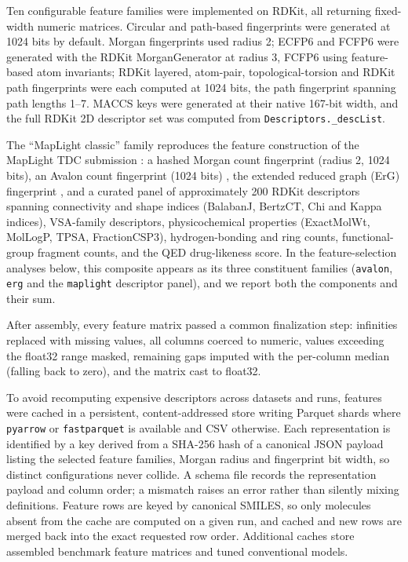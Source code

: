 \documentclass[11pt,a4paper]{article}
\begin{document}
Ten configurable feature families were implemented on RDKit, all returning fixed-width numeric matrices. Circular and path-based fingerprints were generated at 1024 bits by default. Morgan fingerprints \cite{rogers2010ecfp} used radius 2; ECFP6 and FCFP6 were generated with the RDKit MorganGenerator at radius 3, FCFP6 using feature-based atom invariants; RDKit layered, atom-pair, topological-torsion and RDKit path fingerprints were each computed at 1024 bits, the path fingerprint spanning path lengths 1--7. MACCS keys \cite{durant2002maccs} were generated at their native 167-bit width, and the full RDKit 2D descriptor set was computed from \texttt{Descriptors.\_descList}.

The ``MapLight classic'' family reproduces the feature construction of the MapLight TDC submission \cite{notwell2023admet}: a hashed Morgan count fingerprint (radius 2, 1024 bits), an Avalon count fingerprint (1024 bits) \cite{gedeck2006qsar}, the extended reduced graph (ErG) fingerprint \cite{stiefl2006erg}, and a curated panel of approximately 200 RDKit descriptors spanning connectivity and shape indices (BalabanJ, BertzCT, Chi and Kappa indices), VSA-family descriptors, physicochemical properties (ExactMolWt, MolLogP, TPSA, FractionCSP3), hydrogen-bonding and ring counts, functional-group fragment counts, and the QED drug-likeness score. In the feature-selection analyses below, this composite appears as its three constituent families (\texttt{avalon}, \texttt{erg} and the \texttt{maplight} descriptor panel), and we report both the components and their sum.

After assembly, every feature matrix passed a common finalization step: infinities replaced with missing values, all columns coerced to numeric, values exceeding the float32 range masked, remaining gaps imputed with the per-column median (falling back to zero), and the matrix cast to float32.

To avoid recomputing expensive descriptors across datasets and runs, features were cached in a persistent, content-addressed store writing Parquet shards where \texttt{pyarrow} or \texttt{fastparquet} is available and CSV otherwise. Each representation is identified by a key derived from a SHA-256 hash of a canonical JSON payload listing the selected feature families, Morgan radius and fingerprint bit width, so distinct configurations never collide. A schema file records the representation payload and column order; a mismatch raises an error rather than silently mixing definitions. Feature rows are keyed by canonical SMILES, so only molecules absent from the cache are computed on a given run, and cached and new rows are merged back into the exact requested row order. Additional caches store assembled benchmark feature matrices and tuned conventional models.
\end{document}

